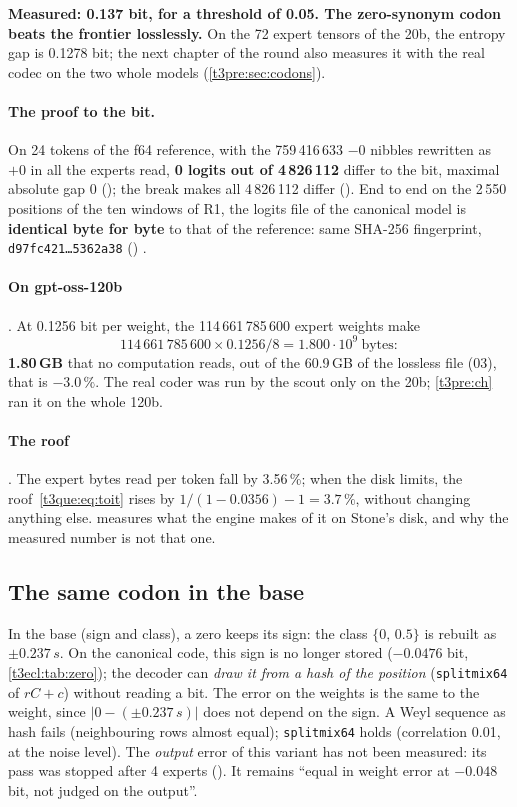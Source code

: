 \textbf{Measured: 0.137 bit, for a threshold of 0.05. The zero-synonym codon beats the frontier losslessly.} On the 72 expert tensors of the 20b, the entropy gap is 0.1278 bit; the next chapter of the round also measures it with the real codec on the two whole models (\cref{t3pre:sec:codons}).

\paragraph{The proof to the bit.} On 24 tokens of the f64 reference, with the 759\,416\,633 $-0$ nibbles rewritten as $+0$ in all the experts read, \textbf{0 logits out of 4\,826\,112} differ to the bit, maximal absolute gap 0 (); the break makes all 4\,826\,112 differ (). End to end on the 2\,550 positions of the ten windows of R1, the logits file of the canonical model is \textbf{identical byte for byte} to that of the reference: same SHA-256 fingerprint, \texttt{d97fc421\ldots 5362a38} () \mes.

\paragraph{On gpt-oss-120b} \calc. At 0.1256 bit per weight, the 114\,661\,785\,600 expert weights make
\[ 114\,661\,785\,600 \times 0.1256 / 8 = 1.800\cdot10^{9} \ \text{bytes}: \] \textbf{1.80\,GB} that no computation reads, out of the 60.9\,GB of the lossless file (03), that is $-3.0\,\%$. The real coder was run by the scout only on the 20b; \cref{t3pre:ch} ran it on the whole 120b.

\paragraph{The roof} \calc. The expert bytes read per token fall by 3.56\,\%; when the disk limits, the roof~\eqref{t3que:eq:toit} rises by $1/(1 - 0.0356) - 1 = 3.7\,\%$, without changing anything else.  measures what the engine makes of it on Stone's disk, and why the measured number is not that one.

\subsection{The same codon in the base}

In the base (sign and class), a zero keeps its sign: the class $\{0,\,0.5\}$ is rebuilt as $\pm0.237\,s$. On the canonical code, this sign is no longer stored ($-0.0476$ bit, \cref{t3ecl:tab:zero}); the decoder can \emph{draw it from a hash of the position} (\texttt{splitmix64} of $rC + c$) without reading a bit. The error on the weights is the same to the weight, since $|0 - (\pm0.237\,s)|$ does not depend on the sign. A Weyl sequence as hash fails (neighbouring rows almost equal); \texttt{splitmix64} holds (correlation 0.01, at the noise level). The \emph{output} error of this variant has not been measured: its pass was stopped after 4 experts (). It remains ``equal in weight error at $-0.048$ bit, not judged on the output''.


